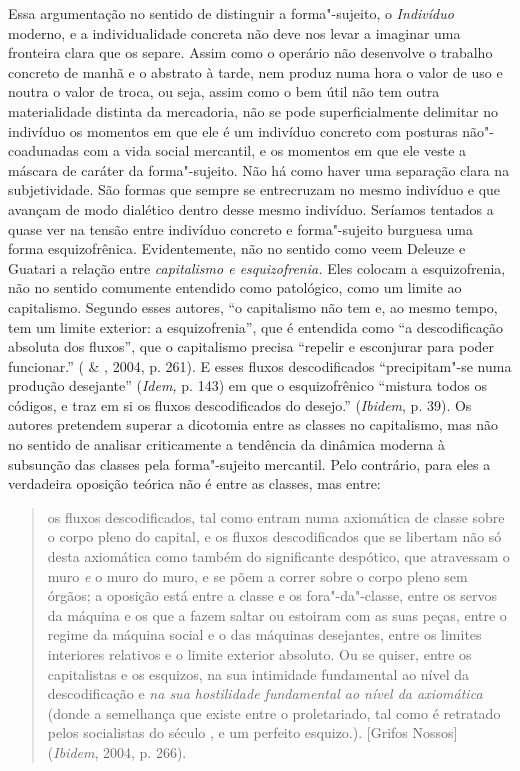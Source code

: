 Essa argumentação no sentido de distinguir a forma"-sujeito, o
\emph{Indivíduo} moderno, e a individualidade concreta não deve nos
levar a imaginar uma fronteira clara que os separe. Assim como o
operário não desenvolve o trabalho concreto de manhã e o abstrato à
tarde, nem produz numa hora o valor de uso e noutra o valor de troca, ou
seja, assim como o bem útil não tem outra materialidade distinta da
mercadoria, não se pode superficialmente delimitar no indivíduo os
momentos em que ele é um indivíduo concreto com posturas não"-coadunadas
com a vida social mercantil, e os momentos em que ele veste a máscara de
caráter da forma"-sujeito. Não há como haver uma separação clara na
subjetividade. São formas que sempre se entrecruzam no mesmo indivíduo e
que avançam de modo dialético dentro desse mesmo indivíduo. Seríamos
tentados a quase ver na tensão entre indivíduo concreto e forma"-sujeito
burguesa uma forma esquizofrênica. Evidentemente, não no sentido como
veem Deleuze e Guatari a relação entre \emph{capitalismo e
esquizofrenia.} Eles colocam a esquizofrenia, não no sentido comumente
entendido como patológico, como um limite ao capitalismo. Segundo esses
autores, ``o capitalismo não tem e, ao mesmo tempo, tem um limite
exterior: a esquizofrenia'', que é entendida como ``a descodificação
absoluta dos fluxos'', que o capitalismo precisa ``repelir e esconjurar
para poder funcionar.'' ( \& , 2004, p. 261). E esses
fluxos descodificados ``precipitam"-se numa produção desejante''
(\emph{Idem,} p. 143) em que o esquizofrênico ``mistura todos os
códigos, e traz em si os fluxos descodificados do desejo.''
(\emph{Ibidem}, p. 39). Os autores pretendem superar a dicotomia entre as
classes no capitalismo, mas não no sentido de analisar criticamente a
tendência da dinâmica moderna à subsunção das classes pela forma"-sujeito
mercantil. Pelo contrário, para eles a verdadeira oposição teórica não é
entre as classes, mas entre:

\begin{quote}
os fluxos descodificados, tal como entram numa axiomática de classe
sobre o corpo pleno do capital, e os fluxos descodificados que se
libertam não só desta axiomática como também do significante despótico,
que atravessam o muro \emph{e} o muro do muro, e se põem a correr sobre
o corpo pleno sem órgãos; a oposição está entre a classe e os
fora"-da"-classe, entre os servos da máquina e os que a fazem saltar ou
estoiram com as suas peças, entre o regime da máquina social e o das
máquinas desejantes, entre os limites interiores relativos e o limite
exterior absoluto. Ou se quiser, entre os capitalistas e os esquizos, na
sua intimidade fundamental ao nível da descodificação e \emph{na sua
hostilidade fundamental ao nível da axiomática} (donde a semelhança que
existe entre o proletariado, tal como é retratado pelos socialistas do
século , e um perfeito esquizo.). [Grifos Nossos] (\emph{Ibidem},
2004, p. 266).
\end{quote}


